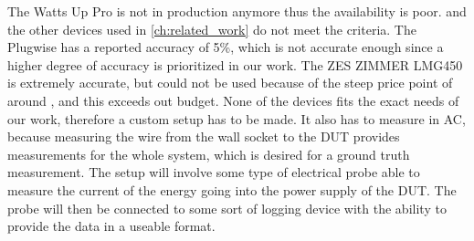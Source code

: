 The Watts Up Pro is not in production anymore thus the availability is poor. and the other devices used in \cref{ch:related_work} do not meet the criteria. The Plugwise has a reported accuracy of 5\%, which is not accurate enough since a higher degree of accuracy is prioritized in our work. The ZES ZIMMER LMG450 is extremely accurate, but could not be used because of the steep price point of around , and this exceeds out budget. None of the devices fits the exact needs of our work, therefore a custom setup has to be made. It also has to measure in AC, because measuring the wire from the wall socket to the DUT provides measurements for the whole system, which is desired for a ground truth measurement. The setup will involve some type of electrical probe able to measure the current of the energy going into the power supply of the DUT. The probe will then be connected to some sort of logging device with the ability to provide the data in a useable format. 

